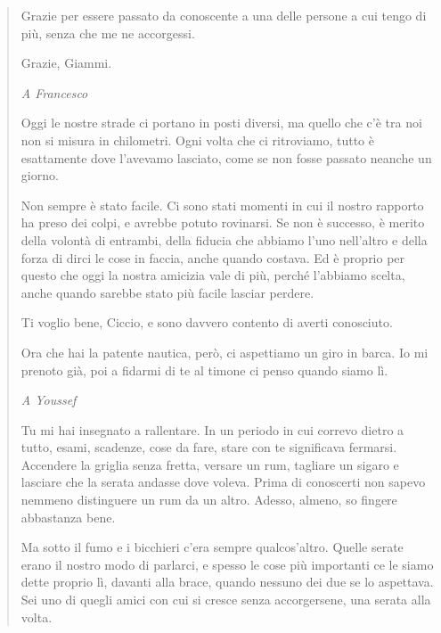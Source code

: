 \begin{quote}
Grazie per essere passato da conoscente a una delle persone a cui tengo di più, senza che me ne accorgessi.\par

Grazie, Giammi.\par

\vspace{5mm}
\textit{A Francesco}\par
\vspace{2mm}
Oggi le nostre strade ci portano in posti diversi, ma quello che c'è tra noi non si misura in chilometri. Ogni volta che ci ritroviamo, tutto è esattamente dove l'avevamo lasciato, come se non fosse passato neanche un giorno.\par

Non sempre è stato facile. Ci sono stati momenti in cui il nostro rapporto ha preso dei colpi, e avrebbe potuto rovinarsi. Se non è successo, è merito della volontà di entrambi, della fiducia che abbiamo l'uno nell'altro e della forza di dirci le cose in faccia, anche quando costava. Ed è proprio per questo che oggi la nostra amicizia vale di più, perché l'abbiamo scelta, anche quando sarebbe stato più facile lasciar perdere.\par

Ti voglio bene, Ciccio, e sono davvero contento di averti conosciuto.\par

Ora che hai la patente nautica, però, ci aspettiamo un giro in barca. Io mi prenoto già, poi a fidarmi di te al timone ci penso quando siamo lì.\par

\vspace{5mm}
\textit{A Youssef}\par
\vspace{2mm}
Tu mi hai insegnato a rallentare. In un periodo in cui correvo dietro a tutto, esami, scadenze, cose da fare, stare con te significava fermarsi. Accendere la griglia senza fretta, versare un rum, tagliare un sigaro e lasciare che la serata andasse dove voleva. Prima di conoscerti non sapevo nemmeno distinguere un rum da un altro. Adesso, almeno, so fingere abbastanza bene.\par

Ma sotto il fumo e i bicchieri c'era sempre qualcos'altro. Quelle serate erano il nostro modo di parlarci, e spesso le cose più importanti ce le siamo dette proprio lì, davanti alla brace, quando nessuno dei due se lo aspettava. Sei uno di quegli amici con cui si cresce senza accorgersene, una serata alla volta.\par


\end{quote}
